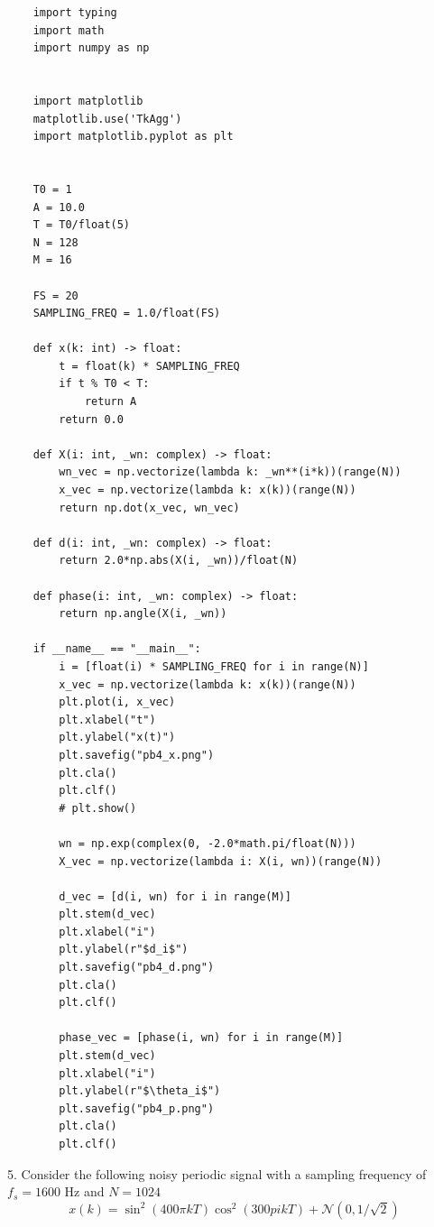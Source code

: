 \documentclass[12pt]{article}
\begin{document}
\FloatBarrier
\begin{lstlisting}
    import typing
    import math
    import numpy as np
    
    
    import matplotlib
    matplotlib.use('TkAgg')
    import matplotlib.pyplot as plt
    
    
    T0 = 1
    A = 10.0
    T = T0/float(5)
    N = 128
    M = 16
    
    FS = 20
    SAMPLING_FREQ = 1.0/float(FS)
    
    def x(k: int) -> float:
        t = float(k) * SAMPLING_FREQ
        if t % T0 < T:
            return A
        return 0.0
    
    def X(i: int, _wn: complex) -> float:
        wn_vec = np.vectorize(lambda k: _wn**(i*k))(range(N))
        x_vec = np.vectorize(lambda k: x(k))(range(N))
        return np.dot(x_vec, wn_vec)
    
    def d(i: int, _wn: complex) -> float:
        return 2.0*np.abs(X(i, _wn))/float(N)
    
    def phase(i: int, _wn: complex) -> float:
        return np.angle(X(i, _wn))
    
    if __name__ == "__main__":
        i = [float(i) * SAMPLING_FREQ for i in range(N)]
        x_vec = np.vectorize(lambda k: x(k))(range(N))
        plt.plot(i, x_vec)
        plt.xlabel("t")
        plt.ylabel("x(t)")
        plt.savefig("pb4_x.png")
        plt.cla()
        plt.clf()
        # plt.show()
    
        wn = np.exp(complex(0, -2.0*math.pi/float(N)))
        X_vec = np.vectorize(lambda i: X(i, wn))(range(N))
    
        d_vec = [d(i, wn) for i in range(M)]
        plt.stem(d_vec)
        plt.xlabel("i")
        plt.ylabel(r"$d_i$")
        plt.savefig("pb4_d.png")
        plt.cla()
        plt.clf()
    
        phase_vec = [phase(i, wn) for i in range(M)]
        plt.stem(d_vec)
        plt.xlabel("i")
        plt.ylabel(r"$\theta_i$")
        plt.savefig("pb4_p.png")
        plt.cla()
        plt.clf()
\end{lstlisting}

\FloatBarrier
\vspace{20pt}
5. Consider the following noisy periodic signal with a sampling
frequency of $f_s= 1600$ Hz and $N= 1024$
\begin{equation*}
    x(k) = \sin^2(400\pi kT)\cos^2(300pi kT) + \mathcal{N}(0, 1/\sqrt{2})
\end{equation*}
\end{document}
